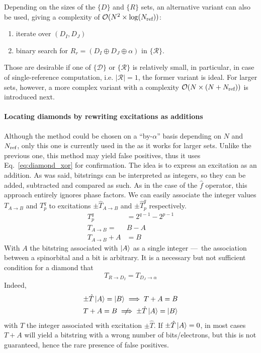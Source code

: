 \documentclass[./thesis.tex]{subfiles}
\begin{document}
Depending on the sizes of the $\{D\}$ and $\{R\}$ sets, an alternative variant can also be used, giving a complexity of $\mathcal{O}(N^2 \times \log({N_\text{ref}}))$:
\begin{enumerate}
\item
iterate over $(D_I, D_J)$
\item
binary search for $R_r = (D_I \oplus D_J \oplus \alpha)$ in $\{\mathcal{R}\}$. 
\end{enumerate}

Those are desirable if one of $\{\mathcal{D}\}$ or $\{\mathcal{R}\}$ is relatively small, in particular, in case of single-reference computation, i.e. $|\mathcal{R}|=1$, the former variant is ideal. For larger sets, however, a more complex variant with a complexity $\mathcal{O}(N \times (N+{N_\text{ref}}))$ is introduced next.


\paragraph{Locating diamonds by rewriting excitations as additions}
Although the method could be chosen on a ``by-$\alpha$'' basis depending on $N$ and ${N_\text{ref}}$, only this one is currently used in the \QP as it works for larger sets.
Unlike the previous one, this method may yield false positives, thus it uses Eq.~\eqref{eq:diamond_xor} for confirmation.
The idea is to express an excitation as an addition. As was said, bitstrings can be interpreted as integers, so they can be added, subtracted and compared as such. As in the case of the $\hat f$ operator, this approach entirely ignores phase factors. We can easily associate the integer values $T_{A \rightarrow B}$ and $T_p^q$ to excitations $\pm \hat T_{A \rightarrow B}$ and $\pm \hat T_p^q$ respectively.
\begin{align}
T_p^q & = 2^{q-1} - 2^{p-1} \\
T_{A \rightarrow B} = &  B - A \\
T_{A \rightarrow B} + A & = B 
\end{align}
With $A$ the bitstring associated with $\ket A$ as a single integer ---~the association between a spinorbital and a bit is arbitrary. It is a necessary but not sufficient condition for a diamond that
\begin{equation}
T_{R \rightarrow D_I} = T_{D_J \rightarrow \alpha}
\end{equation}
Indeed,
\begin{align}
\pm \hat T \ket A = \ket B \implies  T + A = B\\
T + A = B \centernot \implies \pm \hat T \ket A = \ket B
\end{align}
with $T$ the integer associated with excitation $\pm \hat T$. If $\pm \hat T \ket A = 0$, in most cases $T + A$ will yield a bitstring with a wrong number of bits/electrons, but this is not guaranteed, hence the rare presence of false positives.
\end{document}
